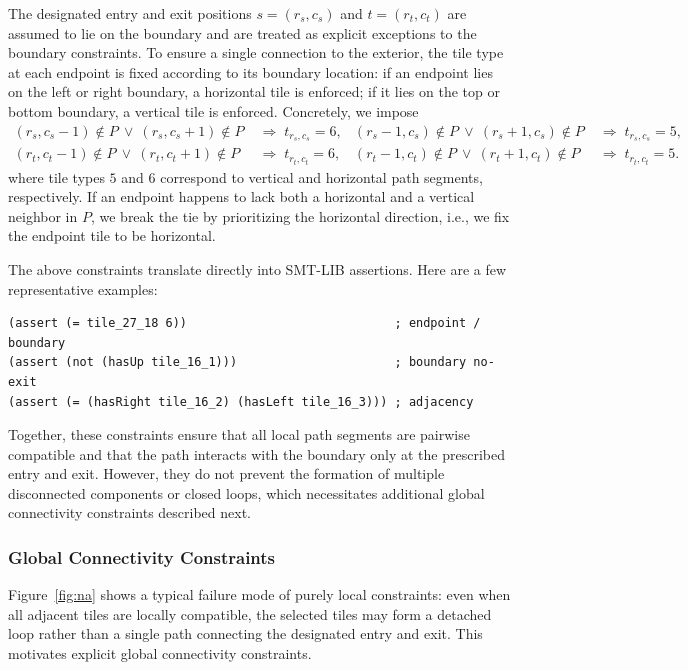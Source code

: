\documentclass[acmsmall,screen,nonacm]{acmart}
\begin{document}
The designated entry and exit positions \(s=(r_s,c_s)\) and
\(t=(r_t,c_t)\) are assumed to lie on the boundary and are treated as
explicit exceptions to the boundary constraints. To ensure a single
connection to the exterior, the tile type at each endpoint is fixed
according to its boundary location: if an endpoint lies on the left or
right boundary, a horizontal tile is enforced; if it lies on the top
or bottom boundary, a vertical tile is enforced. Concretely, we impose
\[
\begin{aligned}
(r_s,c_s-1)\notin P \ \vee\ (r_s,c_s+1)\notin P
&\;\Rightarrow\; t_{r_s,c_s}=6, &
(r_s-1,c_s)\notin P \ \vee\ (r_s+1,c_s)\notin P
&\;\Rightarrow\; t_{r_s,c_s}=5, \\
(r_t,c_t-1)\notin P \ \vee\ (r_t,c_t+1)\notin P
&\;\Rightarrow\; t_{r_t,c_t}=6, &
(r_t-1,c_t)\notin P \ \vee\ (r_t+1,c_t)\notin P
&\;\Rightarrow\; t_{r_t,c_t}=5.
\end{aligned}
\]
where tile types \(5\) and \(6\) correspond to vertical and horizontal
path segments, respectively. If an endpoint happens to lack both a
horizontal and a vertical neighbor in \(P\), we break the tie by
prioritizing the horizontal direction, i.e., we fix the endpoint tile
to be horizontal.

The above constraints translate directly into SMT-LIB assertions. Here
are a few representative examples:
\begin{tcolorbox}[smtsimple]
\begin{verbatim}
(assert (= tile_27_18 6))                             ; endpoint / boundary
(assert (not (hasUp tile_16_1)))                      ; boundary no-exit
(assert (= (hasRight tile_16_2) (hasLeft tile_16_3))) ; adjacency
\end{verbatim}
\end{tcolorbox}

Together, these constraints ensure that all local path segments are
pairwise compatible and that the path interacts with the boundary only
at the prescribed entry and exit. However, they do not prevent the
formation of multiple disconnected components or closed loops, which
necessitates additional global connectivity constraints described
next.

\subsubsection{Global Connectivity Constraints}
Figure~\ref{fig:na} shows a typical failure mode of purely local
constraints: even when all adjacent tiles are locally compatible, the
selected tiles may form a detached loop rather than a single path
connecting the designated entry and exit. This motivates explicit
global connectivity constraints.
\end{document}
